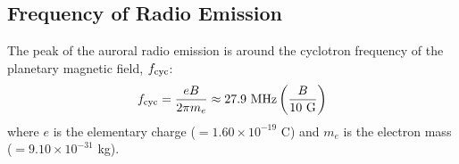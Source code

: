 \documentclass{emulateapj}
\begin{document}
\subsection{Frequency of Radio Emission}
\label{ss:model_frequency}


The peak of the auroral radio emission is around the cyclotron frequency of the planetary magnetic field, $f_{\rm cyc}$: 
\begin{equation}
f_{\rm cyc} = \frac{eB}{2\pi m_e} \approx 27.9 {\rm~MHz} \left( \frac{B}{10 \rm~G} \right) \label{eq:cyc} 
\end{equation}
where $e$ is the elementary charge ($=1.60\times10^{-19}$ C) and $m_e$ is the electron mass ($=9.10\times 10^{-31}$ kg). 

\end{document}
